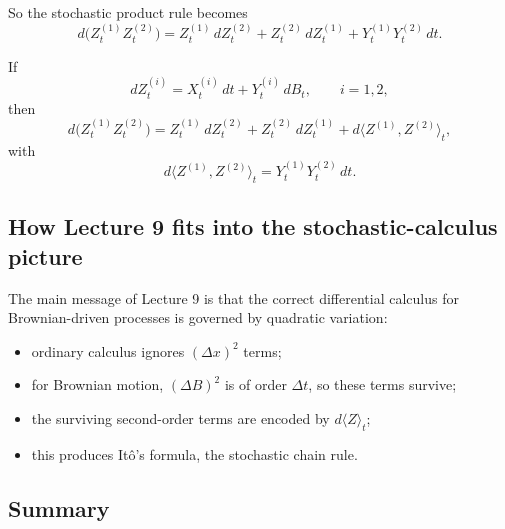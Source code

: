 \documentclass[11pt]{article}
\theoremstyle{definition}
\begin{document}
So the stochastic product rule becomes
\[
d\bigl(Z_t^{(1)}Z_t^{(2)}\bigr)
=
Z_t^{(1)}\,dZ_t^{(2)}
+
Z_t^{(2)}\,dZ_t^{(1)}
+
Y_t^{(1)}Y_t^{(2)}\,dt.
\]

\begin{keyformula}
If
\[
dZ_t^{(i)}=X_t^{(i)}\,dt+Y_t^{(i)}\,dB_t,\qquad i=1,2,
\]
then
\[
d\bigl(Z_t^{(1)}Z_t^{(2)}\bigr)
=
Z_t^{(1)}\,dZ_t^{(2)}
+
Z_t^{(2)}\,dZ_t^{(1)}
+
d\langle Z^{(1)},Z^{(2)}\rangle_t,
\]
with
\[
d\langle Z^{(1)},Z^{(2)}\rangle_t=Y_t^{(1)}Y_t^{(2)}\,dt.
\]
\end{keyformula}

\subsection{How Lecture 9 fits into the stochastic-calculus picture}

The main message of Lecture 9 is that the correct differential calculus for Brownian-driven processes is governed by quadratic variation:

\begin{itemize}[leftmargin=2em]
    \item ordinary calculus ignores \((\Delta x)^2\) terms;
    \item for Brownian motion, \((\Delta B)^2\) is of order \(\Delta t\), so these terms survive;
    \item the surviving second-order terms are encoded by \(d\langle Z\rangle_t\);
    \item this produces It\^o's formula, the stochastic chain rule.
\end{itemize}

\subsection{Summary}
\end{document}
